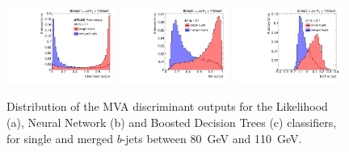 
\begin{figure}[tp]
\centering
\includegraphics[width=0.32\textwidth]{FIGS/Likelihood/NNoutput080_LihoodKDE.pdf}
\includegraphics[width=0.32\textwidth]{FIGS/TEMPFigs/MVA_differentMethods/bins/NNoutput080_MLP.pdf}
\includegraphics[width=0.32\textwidth]{FIGS/TEMPFigs/MVA_differentMethods/bins/NNoutput080_BDT.pdf}
\caption{Distribution of the MVA discriminant outputs for the Likelihood (a), Neural Network (b) and Boosted Decision Trees (c) classifiers, for single and merged $b$-jets between 80~GeV and 110~GeV.}
\label{fig:diffmethodsBins}
\end{figure}

